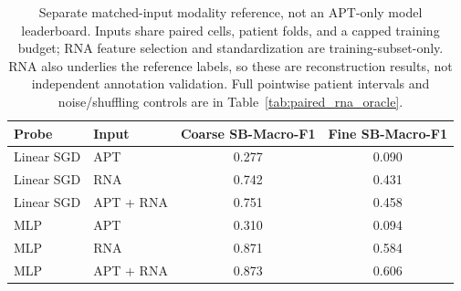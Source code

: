 \begin{table}[t]
\centering\small
\setlength{\tabcolsep}{6pt}
\begin{tabular}{llcc}
\toprule
Probe & Input & Coarse SB-Macro-F1 & Fine SB-Macro-F1 \\
\midrule
Linear SGD & APT & 0.277 & 0.090 \\
Linear SGD & RNA & 0.742 & 0.431 \\
Linear SGD & APT + RNA & 0.751 & 0.458 \\
\midrule
MLP & APT & 0.310 & 0.094 \\
MLP & RNA & 0.871 & 0.584 \\
MLP & APT + RNA & 0.873 & 0.606 \\
\bottomrule
\end{tabular}
\caption{Separate matched-input modality reference, not an APT-only model
leaderboard. Inputs share paired cells, patient folds, and a capped training
budget; RNA feature selection and standardization are training-subset-only.
RNA also underlies the reference labels, so these are reconstruction results,
not independent annotation validation. Full pointwise patient intervals and
noise/shuffling controls are in Table~\ref{tab:paired_rna_oracle}.}
\label{tab:modality_main}
\end{table}
